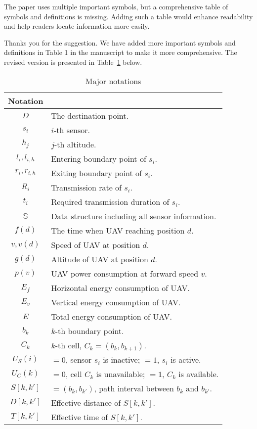 \begin{revcomment}
	The paper uses multiple important symbols, but a comprehensive table of symbols and definitions is missing. Adding such a table would enhance readability and help readers locate information more easily.
\end{revcomment}
\begin{revresponse}
	Thanks you for the suggestion. We have added more important symbols and definitions in Table 1 in the manuscript to make it more comprehensive. The revised version is presented in Table~\ref{tb:notation} below.
	\begin{table}[t]
		\caption{Major notations}
		\label{tb:notation}
		\centering
		\begin{tabular}{c>{\raggedright\arraybackslash}p{10cm}}
			\toprule
			Notation  & \multicolumn{1}{c}{Explanation} \\
			\midrule
			$D$       & The destination point. \\
			$s_i$     & $i$-th sensor. \\
			$h_j$     & $j$-th altitude. \\
			$l_i, l_{i,h}$  & Entering boundary point of $s_i$. \\
			$r_i, r_{i,h}$  & Exiting boundary point of $s_i$. \\
			$R_i$     & Transmission rate of $s_i$. \\
			$t_i$     & Required transmission duration of $s_i$. \\
			$\mathbb{S}$    & Data structure including all sensor information. \\
			$f(d)$    & The time when UAV reaching position $d$. \\
			$v, v(d)$ & Speed of UAV at position $d$. \\
			$g(d)$    & Altitude of UAV at position $d$. \\
			$p(v)$    & UAV power consumption at forward speed $v$. \\
			$E_f$     & Horizontal energy consumption of UAV. \\
			$E_v$     & Vertical energy consumption of UAV. \\
			$E$       & Total energy consumption of UAV. \\
			$b_k$     & $k$-th boundary point. \\
			$C_k$     & $k$-th cell, $C_k=(b_k,b_{k+1})$. \\
			$U_S(i)$  & $=0$, sensor $s_i$ is inactive; $=1$, $s_i$ is active. \\
			$U_C(k)$  & $=0$, cell $C_k$ is unavailable; $=1$, $C_k$ is available. \\
			$S[k,k']$ & $=(b_k,b_{k'})$, path interval between $b_k$ and $b_{k'}$. \\
			$D[k,k']$ & Effective distance of $S[k,k']$. \\
			$T[k,k']$ & Effective time of $S[k,k']$. \\
			\bottomrule
		\end{tabular}
	\end{table}
\end{revresponse}


